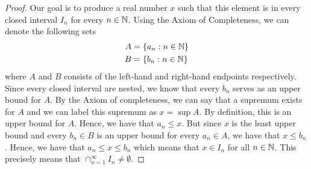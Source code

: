 \begin{proof}
    Our goal is to produce a real number \( x \) such that this element is in every closed interval \( I_n \) for every \( n \in \mathbb{N} \). Using the Axiom of Completeness, we can denote the following sets 
    \begin{align*} A &= \{  a_n : n \in \mathbb{N}  \} \\ 
                   B &= \{  b_n : n \in \mathbb{N}  \}
     \end{align*} 
    where \( A \) and \( B \) consists of the left-hand and right-hand endpoints respectively. Since every closed interval are nested, we know that every \( b_n \) serves as an upper bound for \( A \). By the Axiom of completeness, we can say that a supremum exists for \( A \) and we can label this supremum as \( x = \sup A \). By definition, this is an upper bound for \( A \). Hence, we have that \( a_n \leq x \). But since \( x \) is the least upper bound and every \( b_n \in B \) is an upper bound for every \( a_n \in A \), we have that \( x \leq b_n \). Hence, we have that \( a_n \leq x \leq b_n \) which means that \( x \in I_n \) for all \( n \in \mathbb{N} \). This precisely means that \( \cap_{n=1}^{\infty} I_n \neq \emptyset \).
\end{proof}


% 



